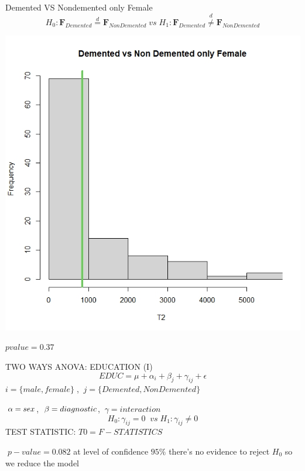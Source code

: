 \documentclass{beamer}
\begin{document}
	\begin{frame}{Demented VS Nondemented only Female}
	\vspace{-0.4cm}
	$$
	H_0: \mathbf{F}_{Demented} \overset{d}{=} \mathbf{F}_{Non Demented}\;vs\;H_1:\mathbf{F}_{Demented} \overset{d}{\neq} \mathbf{F}_{Non Demented}
	$$
	\begin{center}
		\includegraphics[width=0.5\columnwidth]{dvsnfemale.jpeg}
	\end{center}
	\vspace{-0.7cm}
	$pvalue= 0.37 $
		
	\end{frame}
	
	
	\begin{frame}{ TWO WAYS ANOVA: EDUCATION (I)}
	\vspace{-0.3cm}
 	$$ EDUC =   \mu + \alpha_i + \beta_j + \gamma_{ij} + \epsilon  $$
 	$ i =\{male,female\} \;$,
 	$\: j=\{ Demented, Non Demented \}$
 	
 	
 	$\: \alpha= sex \space$, 
	$\: \beta= diagnostic \space$, 
	$\: \gamma= interaction$
	$$
	H_0: \gamma_{ij}=0\; \;vs\;H_1:\gamma_{ij}\neq0 
	$$
	TEST STATISTIC: $ T0= F-STATISTICS \; $
	
	$\; p-value = 0.082 $
	at level of confidence $ 95\% $ there's no evidence to	reject $H_0$ 
	so we reduce the model
	\vspace{-0.2cm}
	
	
\end{frame}
	
\end{document}
